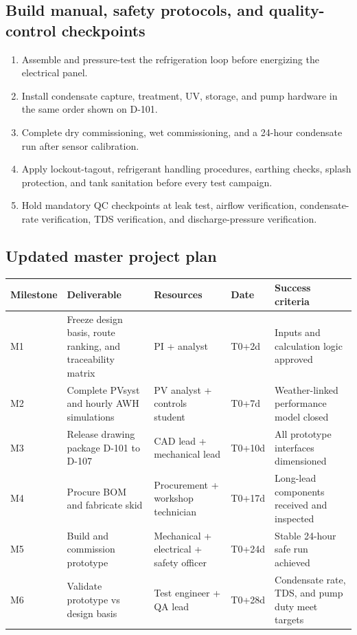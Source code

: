 \documentclass[11pt,a4paper]{article}
\begin{document}
\subsection{Build manual, safety protocols, and quality-control checkpoints}
\begin{enumerate}[leftmargin=*]
  \item Assemble and pressure-test the refrigeration loop before energizing the electrical panel.
  \item Install condensate capture, treatment, UV, storage, and pump hardware in the same order shown on D-101.
  \item Complete dry commissioning, wet commissioning, and a 24-hour condensate run after sensor calibration.
  \item Apply lockout-tagout, refrigerant handling procedures, earthing checks, splash protection, and tank sanitation before every test campaign.
  \item Hold mandatory QC checkpoints at leak test, airflow verification, condensate-rate verification, TDS verification, and discharge-pressure verification.
\end{enumerate}

\subsection{Updated master project plan}
\begin{table}[h]
\centering
\small
\begin{tabular}{@{}p{2.1cm}p{4.2cm}p{3.1cm}p{2.1cm}p{3.2cm}@{}}
\toprule
\textbf{Milestone} & \textbf{Deliverable} & \textbf{Resources} & \textbf{Date} & \textbf{Success criteria} \\
\midrule
M1 & Freeze design basis, route ranking, and traceability matrix & PI + analyst & T0+2d & Inputs and calculation logic approved \\
M2 & Complete PVsyst and hourly AWH simulations & PV analyst + controls student & T0+7d & Weather-linked performance model closed \\
M3 & Release drawing package D-101 to D-107 & CAD lead + mechanical lead & T0+10d & All prototype interfaces dimensioned \\
M4 & Procure BOM and fabricate skid & Procurement + workshop technician & T0+17d & Long-lead components received and inspected \\
M5 & Build and commission prototype & Mechanical + electrical + safety officer & T0+24d & Stable 24-hour safe run achieved \\
M6 & Validate prototype vs design basis & Test engineer + QA lead & T0+28d & Condensate rate, TDS, and pump duty meet targets \\
\bottomrule
\end{tabular}
\end{table}
\end{document}
